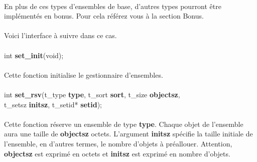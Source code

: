 \documentclass[10pt,a4wide]{article}
\begin{document}
\paragraph{}

En plus de ces types d'ensembles de base, d'autres types pourront
\^etre impl\'ement\'es en bonus. Pour cela r\'ef\'erez vous \`a la section
Bonus.

\paragraph{}

Voici l'interface \`a suivre dans ce cas.

\paragraph{}

\hspace{1.5cm}int \textbf{set\_init}(void);

\paragraph{}

Cette fonction initialise le gestionnaire d'ensembles.

\paragraph{}

\hspace{1.5cm}int \textbf{set\_rsv}(t\_type \textbf{type},
                                    t\_sort \textbf{sort},
                                    t\_size \textbf{objectsz}, \\
\bigskip
\hspace{3.6cm}                      t\_setsz \textbf{initsz},
                                    t\_setid* \textbf{setid});

\paragraph{}

Cette fonction r\'eserve un ensemble de type \textbf{type}. Chaque objet
de l'ensemble aura une taille de \textbf{objectsz} octets.
L'argument \textbf{initsz} sp\'ecifie la taille initiale de l'ensemble,
en d'autres termes, le nombre d'objets \`a pr\'eallouer. Attention,
\textbf{objectsz} est exprim\'e en octets et \textbf{initsz} est exprim\'e
en nombre d'objets.
\end{document}
